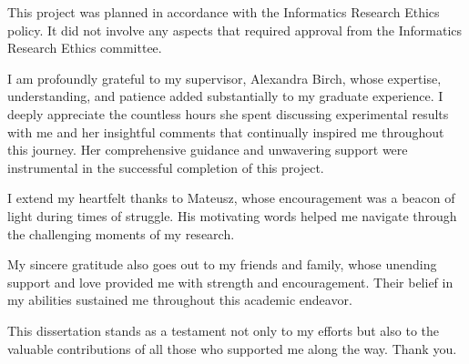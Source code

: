 \documentclass[logo,msc]{infthesis}           %
\begin{document}
\begin{preliminary}
\begin{ethics}
%
This project was planned in accordance with the Informatics Research
Ethics policy. It did not involve any aspects that required approval
from the Informatics Research Ethics committee.

\standarddeclaration
\end{ethics}


\begin{acknowledgements}

I am profoundly grateful to my supervisor, Alexandra Birch, whose expertise, understanding, and patience added substantially to my graduate experience. I deeply appreciate the countless hours she spent discussing experimental results with me and her insightful comments that continually inspired me throughout this journey. Her comprehensive guidance and unwavering support were instrumental in the successful completion of this project.

I extend my heartfelt thanks to Mateusz, whose encouragement was a beacon of light during times of struggle. His motivating words helped me navigate through the challenging moments of my research.

My sincere gratitude also goes out to my friends and family, whose unending support and love provided me with strength and encouragement. Their belief in my abilities sustained me throughout this academic endeavor.

This dissertation stands as a testament not only to my efforts but also to the valuable contributions of all those who supported me along the way. Thank you.

\end{acknowledgements}


\tableofcontents
\end{preliminary}
\end{document}
